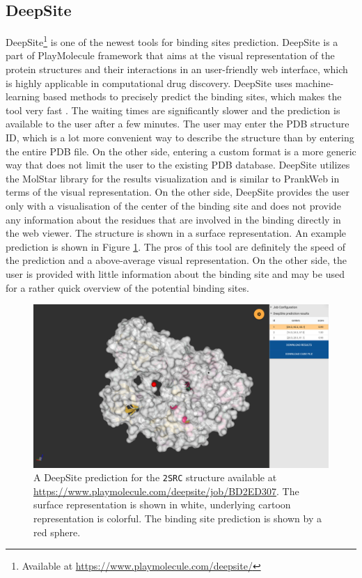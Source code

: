 \subsection{DeepSite}
\label{subsec:deepsite}

DeepSite\footnote{Available at \url{https://www.playmolecule.com/deepsite/}} is one of the newest tools for binding sites prediction. DeepSite is a part of PlayMolecule framework that aims at the visual representation of the protein structures and their interactions in an user-friendly web interface\cite{martinez2017playmolecule}\cite{10.1093/bioinformatics/bty758}, which is highly applicable in computational drug discovery. DeepSite uses machine-learning based methods to precisely predict the binding sites, which makes the tool very fast \cite{10.1093/bioinformatics/btx350}. The waiting times are significantly slower and the prediction is available to the user after a few minutes. The user may enter the PDB structure ID, which is a lot more convenient way to describe the structure than by entering the entire PDB file. On the other side, entering a custom format is a more generic way that does not limit the user to the existing PDB database. DeepSite utilizes the MolStar library for the results visualization and is similar to PrankWeb in terms of the visual representation. On the other side, DeepSite provides the user only with a visualisation of the center of the binding site and does not provide any information about the residues that are involved in the binding directly in the web viewer. The structure is shown in a surface representation. An example prediction is shown in Figure \ref{fig:deepsite_prediction}. The pros of this tool are definitely the speed of the prediction and a above-average visual representation. On the other side, the user is provided with little information about the binding site and may be used for a rather quick overview of the potential binding sites.

\begin{figure}
    \centering
    \includegraphics[width=\linewidth]{img/deepsite_prediction.png}
    \caption{A DeepSite prediction for the \texttt{2SRC} structure available at \url{https://www.playmolecule.com/deepsite/job/BD2ED307}. The surface representation is shown in white, underlying cartoon representation is colorful. The binding site prediction is shown by a red sphere.}
    \label{fig:deepsite_prediction}
\end{figure}